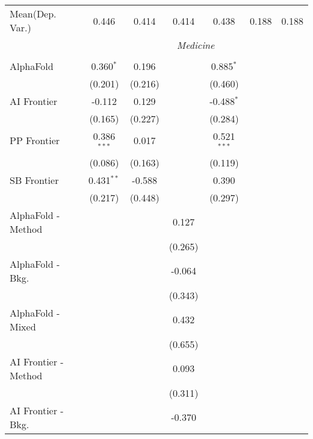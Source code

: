 \begin{tabular}{lcccccc}
Mean(Dep. Var.) & 0.446 & 0.414 & 0.414 & 0.438 & 0.188 & 0.188 \\
 & \multicolumn{6}{c}{\textit{Medicine}} \\ \\
   AlphaFold            & 0.360$^{*}$   & 0.196   &                & 0.885$^{*}$   &        &   \\   
                        & (0.201)       & (0.216) &                & (0.460)       &        &   \\   
   AI Frontier          & -0.112        & 0.129   &                & -0.488$^{*}$  &        &   \\   
                        & (0.165)       & (0.227) &                & (0.284)       &        &   \\   
   PP Frontier          & 0.386$^{***}$ & 0.017   &                & 0.521$^{***}$ &        &   \\   
                        & (0.086)       & (0.163) &                & (0.119)       &        &   \\   
   SB Frontier          & 0.431$^{**}$  & -0.588  &                & 0.390         &        &   \\   
                        & (0.217)       & (0.448) &                & (0.297)       &        &   \\   
   AlphaFold - Method   &               &         & 0.127          &               &        &   \\   
                        &               &         & (0.265)        &               &        &   \\   
   AlphaFold - Bkg.     &               &         & -0.064         &               &        &   \\   
                        &               &         & (0.343)        &               &        &   \\   
   AlphaFold - Mixed    &               &         & 0.432          &               &        &   \\   
                        &               &         & (0.655)        &               &        &   \\   
   AI Frontier - Method &               &         & 0.093          &               &        &   \\   
                        &               &         & (0.311)        &               &        &   \\   
   AI Frontier - Bkg.   &               &         & -0.370         &               &        &   \\   

\end{tabular}

